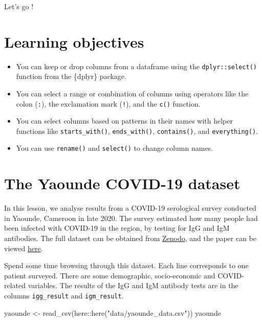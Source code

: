 \documentclass[
  letterpaper,
  DIV=11,
  numbers=noendperiod]{scrreprt}
\newenvironment{Shaded}{\begin{snugshade}}{\end{snugshade}}
\newcommand{\FunctionTok}[1]{\textcolor[rgb]{0.28,0.35,0.67}{#1}}
\newcommand{\NormalTok}[1]{\textcolor[rgb]{0.00,0.23,0.31}{#1}}
\newcommand{\OtherTok}[1]{\textcolor[rgb]{0.00,0.23,0.31}{#1}}
\newcommand{\SpecialCharTok}[1]{\textcolor[rgb]{0.37,0.37,0.37}{#1}}
\newcommand{\StringTok}[1]{\textcolor[rgb]{0.13,0.47,0.30}{#1}}
\begin{document}
Let's go !

\section{Learning objectives}\label{learning-objectives-6}

\begin{itemize}
\item
  You can keep or drop columns from a dataframe using the
  \texttt{dplyr::select()} function from the \{dplyr\} package.
\item
  You can select a range or combination of columns using operators like
  the colon (\texttt{:}), the exclamation mark (\texttt{!}), and the
  \texttt{c()} function.
\item
  You can select columns based on patterns in their names with helper
  functions like \texttt{starts\_with()}, \texttt{ends\_with()},
  \texttt{contains()}, and \texttt{everything()}.
\item
  You can use \texttt{rename()} and \texttt{select()} to change column
  names.
\end{itemize}

\section{The Yaounde COVID-19
dataset}\label{the-yaounde-covid-19-dataset}

In this lesson, we analyse results from a COVID-19 serological survey
conducted in Yaounde, Cameroon in late 2020. The survey estimated how
many people had been infected with COVID-19 in the region, by testing
for IgG and IgM antibodies. The full dataset can be obtained from
\href{https://zenodo.org/record/5218965}{Zenodo}, and the paper can be
viewed \href{https://www.nature.com/articles/s41467-021-25946-0}{here}.

Spend some time browsing through this dataset. Each line corresponds to
one patient surveyed. There are some demographic, socio-economic and
COVID-related variables. The results of the IgG and IgM antibody tests
are in the columns \texttt{igg\_result} and \texttt{igm\_result}.

\begin{Shaded}
\begin{Highlighting}[]
\NormalTok{yaounde }\OtherTok{\textless{}{-}} \FunctionTok{read\_csv}\NormalTok{(here}\SpecialCharTok{::}\FunctionTok{here}\NormalTok{(}\StringTok{"data/yaounde\_data.csv"}\NormalTok{))}
\NormalTok{yaounde  }
\end{Highlighting}
\end{Shaded}
\end{document}
